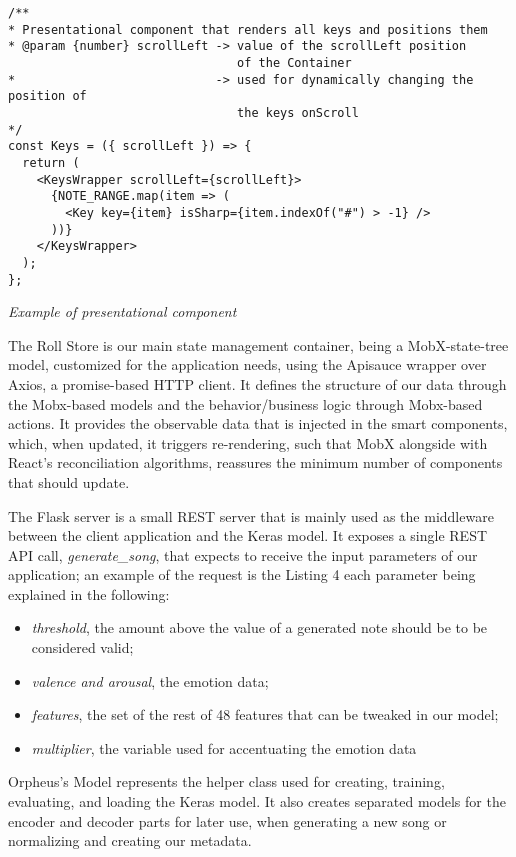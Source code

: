 \begin{listing}
  \begin{verbatim}
/**
* Presentational component that renders all keys and positions them
* @param {number} scrollLeft -> value of the scrollLeft position
                                of the Container
*                            -> used for dynamically changing the position of
                                the keys onScroll
*/
const Keys = ({ scrollLeft }) => {
  return (
    <KeysWrapper scrollLeft={scrollLeft}>
      {NOTE_RANGE.map(item => (
        <Key key={item} isSharp={item.indexOf("#") > -1} />
      ))}
    </KeysWrapper>
  );
};
  \end{verbatim}
  \caption{\emph{Example of presentational component}}
  \label{listing:dumb}
\end{listing}


The Roll Store is our main state management container,
being a MobX-state-tree model,
customized for the application needs,
using the Apisauce wrapper over Axios,
a promise-based HTTP client.
It defines the structure of our data through the Mobx-based
models and the behavior/business logic through Mobx-based actions. It provides the observable data that is injected in the smart components, which, when updated, it triggers re-rendering, such that MobX alongside with React's reconciliation algorithms, reassures the minimum number of components that should update.


The Flask server is a small REST server that is mainly used
as the middleware between the client application and the
Keras model. It exposes a single REST API call,
\emph{generate\_song}, that expects to receive the
input parameters of our application;
an example of the request is the Listing 4
each parameter being explained in the following:
\begin{itemize}
  \item \emph{threshold}, the amount above the value of a generated note should be to be considered valid;
  \item \emph{valence and arousal}, the emotion data;
  \item \emph{features}, the set of the rest of 48 features that can be tweaked in our model;
  \item \emph{multiplier}, the variable used for accentuating the emotion data
\end{itemize}

Orpheus's Model represents the helper class used for creating,
training, evaluating, and loading the Keras model.
It also creates separated models for the encoder and decoder parts
for later use, when generating a new song or
normalizing and creating our metadata.

